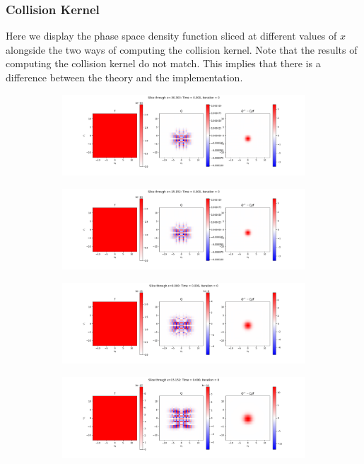 \documentclass{article}
\begin{document}
\subsubsection{Collision Kernel}
Here we display the phase space density function sliced at different values of $x$ alongside the two ways of computing the collision kernel. Note that the results of computing the collision kernel do not match. This implies that there is a difference between the theory and the implementation.
\begin{figure}[H]
  \begin{subfigure}[b]{\textwidth}
    \includegraphics[width=\textwidth]{imgs/lf_output2/slice0/mat0.png}
  \end{subfigure}
  \hfill
  \begin{subfigure}[b]{\textwidth}
    \includegraphics[width=\textwidth]{imgs/lf_output2/slice25/mat0.png}
  \end{subfigure}
  \hfill
  \begin{subfigure}[b]{\textwidth}
    \includegraphics[width=\textwidth]{imgs/lf_output2/slice50/mat0.png}
  \end{subfigure}
  \hfill
  \begin{subfigure}[b]{\textwidth}
    \includegraphics[width=\textwidth]{imgs/lf_output2/slice75/mat0.png}
  \end{subfigure}
\end{figure}
\end{document}
